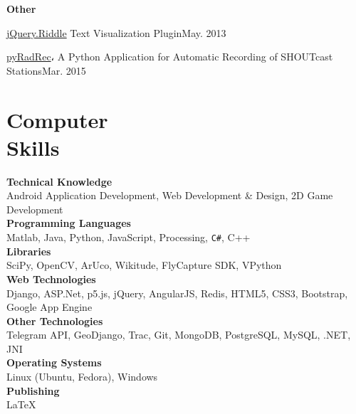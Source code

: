\documentclass[margin,line]{resume}
\begin{document}
\begin{resume}
    {\bf Other}
	\begin{list2} 
        \vspace*{1mm}
         \item \href{https://github.com/mmbrian/jquery.riddle}{jQuery.Riddle} Text Visualization Plugin\hfill{\sf May. 2013}
        \item \href{https://github.com/mmbrian/pyradrec}{pyRadRec}، A Python Application for Automatic Recording of SHOUTcast Stations\hfill{\sf Mar. 2015}
     \end{list2}
        


    \section{\mysidestyle Computer\\Skills} 
    \textbf{Technical Knowledge}‎\\
    Android Application Development, Web Development \& Design, 2D Game Development\vspace{1mm}\\
	‎\textbf{Programming Languages}‎\\
	 Matlab, ‎‎Java, Python, JavaScript, Processing, \texttt{C\#}, C++\vspace{1mm}\\
	 \textbf{Libraries}‎\\
	 SciPy, OpenCV, ArUco, Wikitude, FlyCapture SDK, VPython\vspace{1mm}\\
	 ‎\textbf{Web Technologies}‎\\
	 ‎‎Django, ASP.Net, p5.js, jQuery, AngularJS, Redis, HTML5, CSS3, Bootstrap, Google App Engine\vspace{1mm}\\
	 ‎\textbf{Other Technologies}‎\\
	 Telegram API, GeoDjango, Trac, Git, MongoDB, PostgreSQL, MySQL, .NET, JNI\vspace{1mm}\\
	 ‎\textbf{Operating Systems}‎\\
	 Linux (Ubuntu, Fedora), Windows\vspace{1mm}\\
	 ‎\textbf{Publishing}‎\\
	\LaTeX
    

\end{resume}
\end{document}
